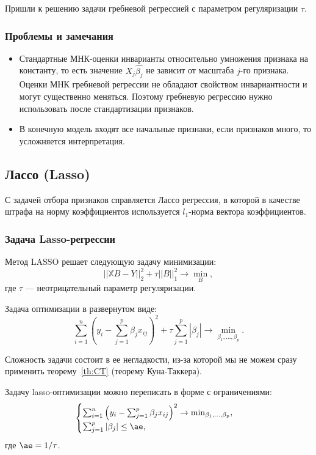 \documentclass[11pt,colorlinks=true]{article}
\begin{document}
Пришли к решению задачи гребневой регрессией с параметром регуляризации $\tau$.
 

\subsubsection{Проблемы и замечания}
\begin{itemize}
\item Стандартные МНК-оценки инварианты относительно умножения признака на константу, то есть значение $X_{j}\hat{\beta_j}$ не зависит от масштаба $j$-го признака. Оценки МНК гребневой регрессии не обладают свойством инвариантности и могут существенно меняться.
Поэтому гребневую регрессию нужно использовать после стандартизации признаков.
\item  В конечную модель входят все начальные признаки, если признаков много, то усложняется интерпретация.
\end{itemize}





\subsection{Лассо (Lasso)}

С задачей отбора признаков справляется Лассо регрессия, в которой в качестве штрафа на норму коэффициентов используется $l_{1}$-норма вектора коэффициентов.


\subsubsection{Задача Lasso-регрессии}

Метод LASSO решает следующую задачу минимизации:
\begin{equation*}
||\mathbb{X}B-Y||_{2}^{2}
+
\tau||B||_{1}^{2}
\rightarrow\min_{B},
\end{equation*}
где $\tau$ --- неотрицательный параметр регуляризации.

Задача оптимизации в развернутом виде:
\begin{equation*}
\sum_{i=1}^{n}
\left(
y_{i}
-
\sum_{j=1}^{p}\beta_{j}x_{ij}
\right)^{2}
+
\tau\sum_{j=1}^{p}|\beta_{j}|
\rightarrow\min_{\beta_{1},\ldots,\beta_{p}}.
\end{equation*}

Сложность задачи состоит в ее негладкости, из-за которой мы не можем сразу применить теорему~\ref{th:CT} (теорему Куна-Таккера).

 Задачу lasso-оптимизации можно переписать в форме с ограничениями: %
\begin{equation*}%
\begin{cases}
\sum_{i=1}^{n}
\left(
y_{i}
-
\sum_{j=1}^{p}\beta_{j}x_{ij}
\right)^{2}
\to
\min_{\beta_{1},\ldots,\beta_{p}},\\
\sum_{j=1}^{p}|\beta_{j}|\leq\ae,
\end{cases}
\end{equation*}
где $\ae=1/\tau$.
\end{document}
